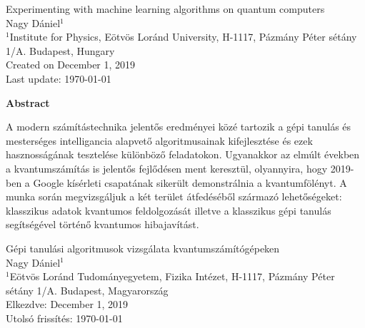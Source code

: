 \documentclass[12pt, a4paper,  nobibnotes]{article}
\begin{document}
\begin{center}
\vspace*{5.0cm}
\LARGE{Experimenting with machine learning algorithms on quantum computers}\\
\vspace{2.0cm}
\large{Nagy Dániel$^1$}\\
\vspace{2.0cm}
\large{
    $^1$Institute for Physics, Eötvös Loránd University, H-1117, Pázmány Péter sétány 1/A. Budapest, Hungary\\%
    \vspace{5.0cm}
    Created on December 1, 2019\\
    \vspace{1.0cm}
    Last update: \today
}
\end{center}
\thispagestyle{empty} %
\newpage

\begin{center}
    \textbf{Abstract}\\
    \par A modern számítástechnika jelentős eredményei közé tartozik a gépi
    tanulás és mesterséges intelligancia alapvető algoritmusainak kifejlesztése és ezek 
    hasznosságának tesztelése különböző feladatokon. Ugyanakkor az elmúlt években a 
    kvantumszámítás is jelentős fejlődésen ment keresztül, olyannyira, hogy 2019-ben a Google kísérleti
    csapatának sikerült demonstrálnia a kvantumfölényt. A munka során megvizsgáljuk a két terület átfedéséből 
    származó lehetőségeket: klasszikus adatok kvantumos feldolgozását illetve a klasszikus
    gépi tanulás segítségével történő kvantumos hibajavítást.
\end{center}
\thispagestyle{empty} %
\newpage

\begin{center}
\vspace*{5.0cm}
\LARGE{Gépi tanulási algoritmusok vizsgálata kvantumszámítógépeken}\\
\vspace{2.0cm}
\large{Nagy Dániel$^1$}\\
\vspace{2.0cm}
\large{
    $^1$Eötvös Loránd Tudományegyetem, Fizika Intézet, H-1117, Pázmány Péter sétány 1/A. Budapest, Magyarország\\%
    \vspace{5.0cm}
    Elkezdve: December 1, 2019\\
    \vspace{1.0cm}
    Utolsó frissítés: \today
}
\end{center}
\thispagestyle{empty} %
\newpage
\end{document}
